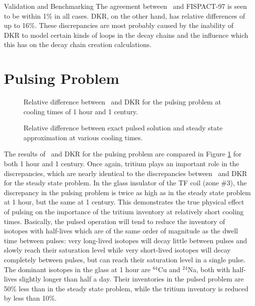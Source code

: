 \begin{chapter}{Validation and Benchmarking}
The agreement between \ALARA\ and FISPACT-97 is seen to be within 1\% in
all cases.  DKR, on the other hand, has relative differences of up to
16\%.  These discrepancies are most probably caused by the inability
of DKR to model certain kinds of loops in the decay chains and the
influence which this has on the decay chain creation calculations.

\section{Pulsing Problem}

\begin{figure}[htbp]
  \begin{center}
    \caption{Relative difference between \ALARA\ and DKR for
      the pulsing problem at cooling times of 1 hour and 1 century.}
    \label{fig:rel.diff.p.1}
  \end{center}
\end{figure}

\begin{figure}[htbp]
  \begin{center}
    \caption{Relative difference between exact pulsed solution and steady state approximation at various cooling times.}
    \label{fig:rel.diff.approx}
  \end{center}
\end{figure}
The results of \ALARA\ and DKR for the pulsing problem are compared in
Figure \ref{fig:rel.diff.p.1} for both 1 hour and 1 century.  Once
again, tritium plays an important role in the discrepancies, which are
nearly identical to the discrepancies between \ALARA\ and DKR for the
steady state problem.  In the glass insulator of the TF coil (zone
\#3), the discrepancy in the pulsing problem is twice as high as in
the steady state problem at 1 hour, but the same at 1 century.  This
demonstrates the true physical effect of pulsing on the importance of
the tritium inventory at relatively short cooling times.  Basically,
the pulsed operation will tend to reduce the inventory of isotopes
with half-lives which are of the same order of magnitude as the dwell
time between pulses: very long-lived isotopes will decay little
between pulses and slowly reach their saturation level while very
short-lived isotopes will decay completely between pulses, but can
reach their saturation level in a single pulse\cite{bib:sisolak}.  The
dominant isotopes in the glass at 1 hour are $^{64}$Cu and $^{24}$Na,
both with half-lives slightly longer than half a day.  Their
inventories in the pulsed problem are 50\% less than in the steady
state problem, while the tritium inventory is reduced by less than
10\%.


\end{chapter}
